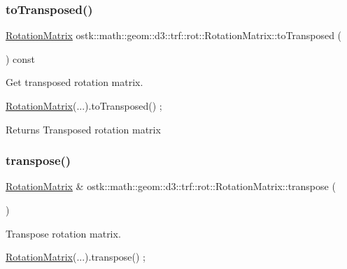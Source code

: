 \subsubsection{\texorpdfstring{to\+Transposed()}{toTransposed()}}
{\footnotesize\ttfamily \hyperlink{classostk_1_1math_1_1geom_1_1d3_1_1trf_1_1rot_1_1_rotation_matrix}{Rotation\+Matrix} ostk\+::math\+::geom\+::d3\+::trf\+::rot\+::\+Rotation\+Matrix\+::to\+Transposed (\begin{DoxyParamCaption}{ }\end{DoxyParamCaption}) const}



Get transposed rotation matrix. 


\begin{DoxyCode}
\hyperlink{classostk_1_1math_1_1geom_1_1d3_1_1trf_1_1rot_1_1_rotation_matrix_a5e6bed0779ad7db0c5bf26b2bd96f8ba}{RotationMatrix}(...).toTransposed() ;
\end{DoxyCode}


\begin{DoxyReturn}{Returns}
Transposed rotation matrix 
\end{DoxyReturn}
\mbox{\label{classostk_1_1math_1_1geom_1_1d3_1_1trf_1_1rot_1_1_rotation_matrix_aceb59983b55cc27128e0d720bcd4e1af}} 
\subsubsection{\texorpdfstring{transpose()}{transpose()}}
{\footnotesize\ttfamily \hyperlink{classostk_1_1math_1_1geom_1_1d3_1_1trf_1_1rot_1_1_rotation_matrix}{Rotation\+Matrix} \& ostk\+::math\+::geom\+::d3\+::trf\+::rot\+::\+Rotation\+Matrix\+::transpose (\begin{DoxyParamCaption}{ }\end{DoxyParamCaption})}



Transpose rotation matrix. 


\begin{DoxyCode}
\hyperlink{classostk_1_1math_1_1geom_1_1d3_1_1trf_1_1rot_1_1_rotation_matrix_a5e6bed0779ad7db0c5bf26b2bd96f8ba}{RotationMatrix}(...).transpose() ;
\end{DoxyCode}
 \mbox{\label{classostk_1_1math_1_1geom_1_1d3_1_1trf_1_1rot_1_1_rotation_matrix_aa0d194dc4e0504fe29cf593b5b6182f4}} 
